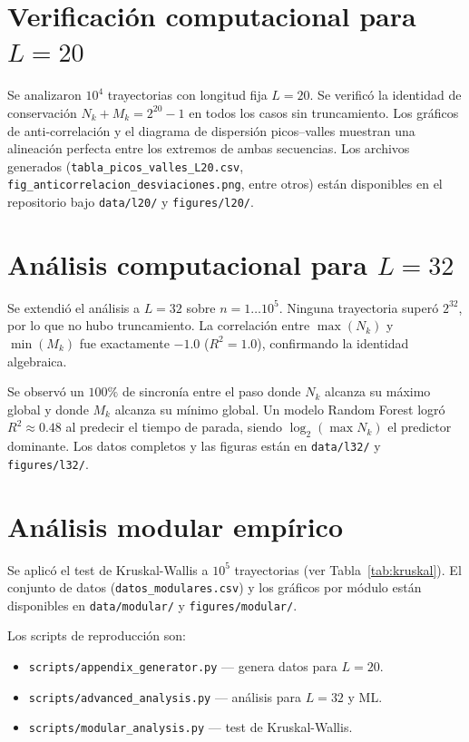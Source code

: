 \documentclass[11pt,a4paper]{article}
\begin{document}
\appendix

\section{Verificación computacional para $L = 20$}
\label{app:A}

Se analizaron $10^4$ trayectorias con longitud fija $L = 20$.
Se verificó la identidad de conservación $N_k + M_k = 2^{20}-1$
en todos los casos sin truncamiento.
Los gráficos de anti-correlación y el diagrama de dispersión
picos--valles muestran una alineación perfecta entre los extremos
de ambas secuencias.
Los archivos generados (\texttt{tabla\_picos\_valles\_L20.csv},
\texttt{fig\_anticorrelacion\_desviaciones.png}, entre otros)
están disponibles en el repositorio bajo \texttt{data/l20/} y
\texttt{figures/l20/}.

\section{Análisis computacional para $L = 32$}
\label{app:B}

Se extendió el análisis a $L = 32$ sobre $n = 1 \dots 10^5$.
Ninguna trayectoria superó $2^{32}$, por lo que no hubo truncamiento.
La correlación entre $\max(N_k)$ y $\min(M_k)$ fue exactamente
$-1.0$ ($R^2 = 1.0$), confirmando la identidad algebraica.

Se observó un $100\%$ de sincronía entre el paso donde $N_k$
alcanza su máximo global y donde $M_k$ alcanza su mínimo global.
Un modelo Random Forest logró $R^2 \approx 0.48$ al predecir
el tiempo de parada, siendo $\log_2(\max N_k)$ el predictor
dominante.
Los datos completos y las figuras están en \texttt{data/l32/}
y \texttt{figures/l32/}.

\section{Análisis modular empírico}
\label{app:C}

Se aplicó el test de Kruskal-Wallis a $10^5$ trayectorias
(ver Tabla~\ref{tab:kruskal}).
El conjunto de datos (\texttt{datos\_modulares.csv}) y los gráficos
por módulo están disponibles en \texttt{data/modular/} y
\texttt{figures/modular/}.

Los scripts de reproducción son:
\begin{itemize}[noitemsep]
  \item \texttt{scripts/appendix\_generator.py} — genera datos para $L=20$.
  \item \texttt{scripts/advanced\_analysis.py} — análisis para $L=32$ y ML.
  \item \texttt{scripts/modular\_analysis.py} — test de Kruskal-Wallis.
\end{itemize}
\end{document}
